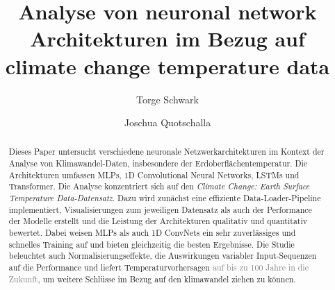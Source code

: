 \documentclass[manuscript,screen,review]{acmart}
\begin{document}
\title[Analyse von neuronal networks und climate change temperature data]{Analyse von neuronal network Architekturen im Bezug auf climate change temperature data}

\author{Torge Schwark}
\author{Joschua Quotschalla}
\authornotemark[1]

\begin{abstract}
Dieses Paper untersucht verschiedene neuronale Netzwerkarchitekturen 
im Kontext der Analyse von Klimawandel-Daten, insbesondere der Erdoberflächentemperatur. 
Die Architekturen umfassen MLPs, 1D Convolutional Neural Networks, LSTMs und Transformer. 
Die Analyse konzentriert sich auf den \textit{Climate Change: Earth Surface Temperature Data-Datensatz}. 
Dazu wird zunächst eine effiziente Data-Loader-Pipeline implementiert, Visualisierungen zum jeweiligen Datensatz 
als auch der Performance der Modelle erstellt und die Leistung der Architekturen qualitativ und quantitativ bewertet. 
Dabei weisen MLPs als auch 1D ConvNets ein sehr zuverlässiges und schnelles Training auf 
und bieten gleichzeitig die besten Ergebnisse. 
Die Studie beleuchtet auch Normalisierungseffekte, die Auswirkungen variabler Input-Sequenzen auf die Performance
und liefert Temperaturvorhersagen \textcolor{gray}{auf bis zu 100 Jahre in die Zukunft}, 
um weitere Schlüsse im Bezug auf den klimawandel ziehen zu können.
\end{abstract}
\end{document}

